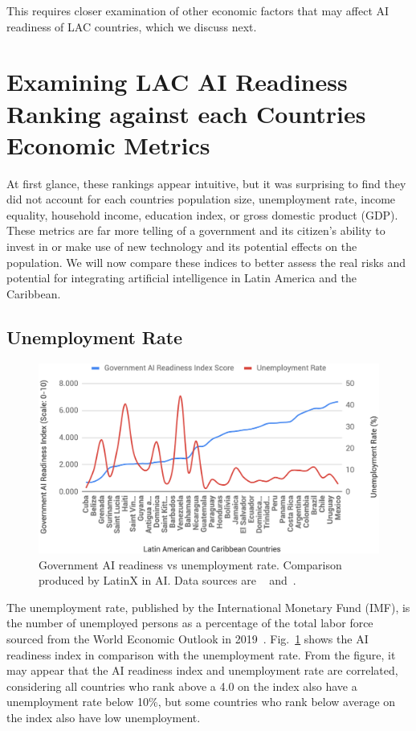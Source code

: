 \documentclass[conference]{IEEEtran}
\begin{document}
This requires closer examination of other economic factors that may affect AI readiness of LAC countries, which we discuss next.


\section{Examining LAC AI Readiness Ranking against each Countries Economic Metrics}

At first glance, these rankings appear intuitive, but it was surprising to find they did not account for each countries population size, unemployment rate, income equality, household income, education index, or gross domestic product (GDP). These metrics are far more telling of a government and its citizen's ability to invest in or make use of new technology and its potential effects on the population. We will now compare these indices to better assess the real risks and potential for integrating artificial intelligence in Latin America and the Caribbean.

\subsection{Unemployment Rate}

\begin{figure}[!b]
\centering
\includegraphics[width=\columnwidth]{unemployment}
\caption{Government AI readiness vs unemployment rate. Comparison produced by LatinX in AI\texttrademark. Data sources are ~\cite{miller2019government} and~\cite{nam2019world}.}
\label{fig:unemployment}
\end{figure}

The unemployment rate, published by the International Monetary Fund (IMF), is the number of unemployed persons as a percentage of the total labor force sourced from the World Economic Outlook in 2019~\cite{nam2019world}. Fig.~\ref{fig:unemployment} shows the AI readiness index in comparison with the unemployment rate. From the figure, it may appear that the AI readiness index and unemployment rate are correlated, considering all countries who rank above a 4.0 on the index also have a unemployment rate below 10\%, but some countries who rank below average on the index also have low unemployment.
\end{document}

